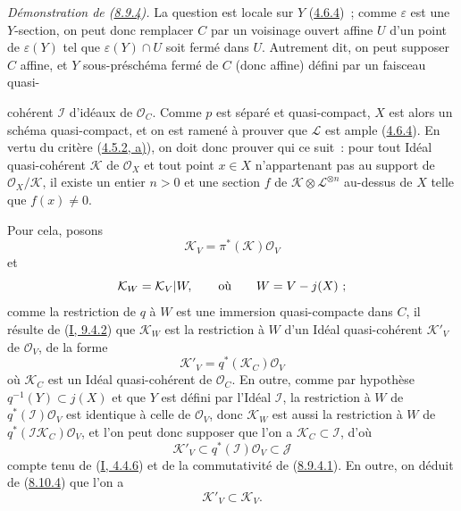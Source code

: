 \begin{env}[8.10.6]
\label{II.8.10.6-fr}
\emph{Démonstration de (\hyperref[II.8.9.4-fr]{8.9.4}).} La question est
locale sur $Y$ (\hyperref[II.4.6.4-fr]{4.6.4})~; comme $\varepsilon$ est une
$Y$-section, on peut donc remplacer $C$ par un voisinage ouvert affine $U$
d'un point de $\varepsilon(Y)$ tel que $\varepsilon(Y)\cap U$ soit fermé dans
$U$. Autrement dit, on peut supposer $C$ affine, et $Y$ sous-préschéma fermé
de $C$ (donc affine) défini par un faisceau quasi-

cohérent $\mathcal{I}$ d'idéaux de $\mathcal{O}_C$. Comme $p$ est séparé et
quasi-compact, $X$ est alors un schéma quasi-compact, et on est ramené à
prouver que $\mathcal{L}$ est ample
(\hyperref[II.4.6.4-fr]{4.6.4}). En vertu du critère
(\hyperref[II.4.5.2-fr]{4.5.2, a)}), on doit donc prouver qui ce suit~: pour
tout Idéal quasi-cohérent $\mathcal{K}$ de $\mathcal{O}_X$ et tout point
$x\in X$ n'appartenant pas au support de $\mathcal{O}_X/\mathcal{K}$, il
existe un entier $n>0$ et une section $f$ de
$\mathcal{K}\otimes\mathcal{L}^{\otimes n}$ au-dessus de $X$ telle que
$f(x)\neq0$.

Pour cela, posons
\[
  \mathcal{K}_V=\pi^*(\mathcal{K})\mathcal{O}_V
\]
et
\[
  \mathcal{K}_W=\mathcal{K}_V|W,\qquad\hbox{où}\qquad W=V-j(X)~;
\]
comme la restriction de $q$ à $W$ est une immersion quasi-compacte dans $C$,
il résulte de (\hyperref[I.9.4.2-fr]{I, 9.4.2}) que $\mathcal{K}_W$ est la
restriction à $W$ d'un Idéal quasi-cohérent $\mathcal{K}'_V$ de
$\mathcal{O}_V$, de la forme
\[
  \mathcal{K}'_V=q^*(\mathcal{K}_C)\mathcal{O}_V
\]
où $\mathcal{K}_C$ est un Idéal quasi-cohérent de $\mathcal{O}_C$. En outre,
comme par hypothèse $q^{-1}(Y)\subset j(X)$ et que $Y$ est défini par l'Idéal
$\mathcal{I}$, la restriction à $W$ de $q^*(\mathcal{I})\mathcal{O}_V$ est
identique à celle de $\mathcal{O}_V$, donc $\mathcal{K}_W$ est aussi la
restriction à $W$ de $q^*(\mathcal{I}\mathcal{K}_C)\mathcal{O}_V$, et l'on
peut donc supposer que l'on a $\mathcal{K}_C\subset\mathcal{I}$, d'où
\begin{equation}
\label{II.8.10.6.1-fr}
  \mathcal{K}'_V\subset q^*(\mathcal{I})\mathcal{O}_V\subset\mathcal{J}
\tag{8.10.6.1}
\end{equation}
compte tenu de (\hyperref[I.4.4.6-fr]{I, 4.4.6}) et de la commutativité de
(\hyperref[II.8.9.4.1-fr]{8.9.4.1}). En outre, on déduit de
(\hyperref[II.8.10.4-fr]{8.10.4}) que l'on a
\begin{equation}
\label{II.8.10.6.2-fr}
  \mathcal{K}'_V\subset\mathcal{K}_V.
\tag{8.10.6.2}
\end{equation}


\end{env}
